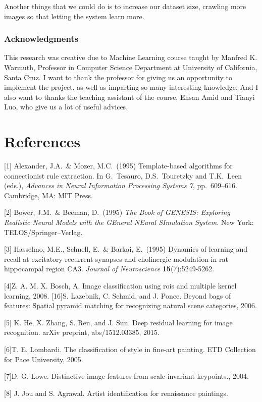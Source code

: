 \documentclass{article}
\begin{document}
Another things that we could do is to increase our dataset size, crawling more images so that letting the system learn more.

\subsubsection*{Acknowledgments}
This research was creative due to Machine Learning course taught by Manfred K. Warmuth, Professor in Computer Science Department at University of California, Santa Cruz. I want to thank the professor for giving us an opportunity to implement the project, as well as imparting so many interesting knowledge. And I also want to thanks the teaching assistant of the course, Ehsan Amid and Tianyi Luo, who give us a lot of useful advices.






\section*{References}

  
[1] Alexander, J.A.\ \& Mozer, M.C.\ (1995) Template-based algorithms
for connectionist rule extraction. In G.\ Tesauro, D.S.\ Touretzky and
T.K.\ Leen (eds.), {\it Advances in Neural Information Processing
  Systems 7}, pp.\ 609--616. Cambridge, MA: MIT Press.

[2] Bower, J.M.\ \& Beeman, D.\ (1995) {\it The Book of GENESIS:
  Exploring Realistic Neural Models with the GEneral NEural SImulation
  System.}  New York: TELOS/Springer--Verlag.

[3] Hasselmo, M.E., Schnell, E.\ \& Barkai, E.\ (1995) Dynamics of
learning and recall at excitatory recurrent synapses and cholinergic
modulation in rat hippocampal region CA3. {\it Journal of
  Neuroscience} {\bf 15}(7):5249-5262.
  
[4]Z. A. M. X. Bosch, A. Image classification using rois and multiple kernel learning, 2008. [16]S. Lazebnik, C. Schmid, and J. Ponce. Beyond bags of features: Spatial pyramid matching for recognizing natural scene categories, 2006.

[5] K. He, X. Zhang, S. Ren, and J. Sun. Deep residual learning for image recognition. arXiv preprint, abs/1512.03385,
2015.
 
[6]T. E. Lombardi. The classification of style in fine-art painting. ETD Collection for Pace University, 2005. 

[7]D. G. Lowe. Distinctive image features from scale-invariant keypoints., 2004. 

[8] J. Jou and S. Agrawal. Artist identification for renaissance paintings.
\end{document}
